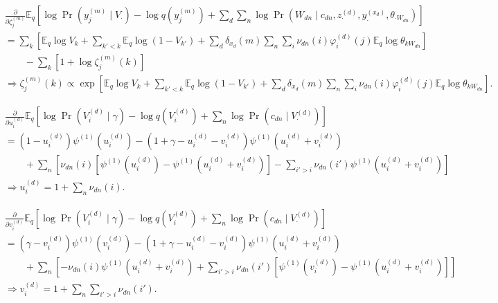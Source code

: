 \documentclass{article}
\newcommand{\trigamma}[1]{\ensuremath{\psi^{(1)}\left(#1\right)}}
\newcommand{\Eq}{\ensuremath{\mathbb{E}_q\xspace}}
\newcommand{\pd}[1]{\ensuremath{\frac{\partial}{\partial #1}}}
\begin{document}
\begin{align*}
    &\pd{\zeta_j^{(m)}} \Eq \left[ \log \Pr(y_j^{(m)} \mid V_\cdot) - \log q(y_j^{(m)}) + \sum_d \sum_n \log \Pr\left(W_{dn} \mid c_{dn}, z_\cdot^{(d)}, y_\cdot^{(x_d)}, \theta_{\cdot W_{dn}}\right) \right] \\
    &= \sum_k \left[ \Eq \log V_k + \sum_{k'<k} \Eq \log (1-V_{k'}) + \sum_d \delta_{x_d}(m) \sum_n \sum_i \nu_{dn}(i) \varphi_i^{(d)}(j) \Eq \log \theta_{k W_{dn}} \right] \\
    &\qquad - \sum_k \left[ 1 + \log \zeta_j^{(m)}(k) \right] \\
    &\Rightarrow
    \boxed{ \zeta_j^{(m)}(k) \propto \exp\left[ \Eq \log V_k + \sum_{k'<k} \Eq \log (1-V_{k'}) + \sum_d \delta_{x_d}(m) \sum_n \sum_i \nu_{dn}(i) \varphi_i^{(d)}(j) \Eq \log \theta_{k W_{dn}} \right] } .
\end{align*}

\begin{align*}
    &\pd{u_i^{(d)}} \Eq \left[ \log \Pr(V_i^{(d)} \mid \gamma) - \log q(V_i^{(d)}) + \sum_n \log \Pr(c_{dn} \mid V^{(d)}_\cdot) \right] \\
    &= (1 - u_i^{(d)}) \trigamma{u_i^{(d)}} - (1 + \gamma - u_i^{(d)} - v_i^{(d)}) \trigamma{u_i^{(d)} + v_i^{(d)}} \\
    &\qquad + \sum_n \left[ \nu_{dn}(i) \left[ \trigamma{u_i^{(d)}} - \trigamma{u_i^{(d)} + v_i^{(d)}} \right] - \sum_{i'>i} \nu_{dn}(i') \trigamma{u_i^{(d)} + v_i^{(d)}} \right] \\
    &\Rightarrow
    \boxed{ u_i^{(d)} = 1 + \sum_n \nu_{dn}(i) }.
\end{align*}

\begin{align*}
    &\pd{v_i^{(d)}} \Eq \left[ \log \Pr(V_i^{(d)} \mid \gamma) - \log q(V_i^{(d)}) + \sum_n \log \Pr(c_{dn} \mid V^{(d)}_\cdot) \right] \\
    &= (\gamma - v_i^{(d)}) \trigamma{v_i^{(d)}} - (1 + \gamma - u_i^{(d)} - v_i^{(d)}) \trigamma{u_i^{(d)} + v_i^{(d)}} \\
    &\qquad + \sum_n \left[ - \nu_{dn}(i) \trigamma{u_i^{(d)} + v_i^{(d)}} + \sum_{i'>i} \nu_{dn}(i') \left[ \trigamma{v_i^{(d)}} - \trigamma{u_i^{(d)} + v_i^{(d)}} \right] \right] \\
    &\Rightarrow
    \boxed{ v_i^{(d)} = 1 + \sum_n \sum_{i'>i} \nu_{dn}(i') }.
\end{align*}
\end{document}
